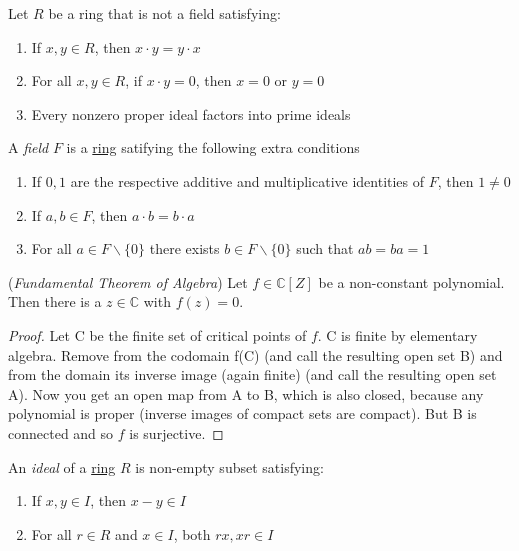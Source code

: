 \begin{definition} \label{dedekind} %
  Let $R$ be a ring that is not a field satisfying:
  \begin{enumerate}
    \item If $x,y \in R$, then $x \cdot y = y \cdot x$
    \item For all $x,y \in R $, if $x\cdot y = 0$, then $x = 0 $ or $y = 0$
    \item Every nonzero proper ideal factors into prime ideals 
  \end{enumerate}
\end{definition}

\begin{definition} \label{field} %
  A \emph{field} $F$ is a \hyperref[ring]{ring} satifying the following extra conditions
  \begin{enumerate}
    \item If $0,1$ are the respective additive and multiplicative identities of $F$, then $1 \neq 0$
    \item If $a,b \in F$, then $a\cdot b = b \cdot a$ 
    \item For all $a \in F \backslash \lbrace 0 \rbrace $ there exists $b \in F \backslash \lbrace 0 \rbrace $ such that $ab = ba = 1$
  \end{enumerate}
\end{definition}

\begin{theorem} \label{fun} (\textit{Fundamental Theorem of Algebra})
  Let $f \in \mathbb{C}[Z]$ be a non-constant polynomial.  Then there is a $z\in\mathbb{C}$ with $f(z)=0$.
\end{theorem}
\begin{proof}
  Let C be the finite set of critical points of $f$. C is finite by elementary algebra. Remove from the codomain f(C) (and call the resulting open set B) and from the domain its inverse image (again finite) (and call the resulting open set A). Now you get an open map from A to B, which is also closed, because any polynomial is proper (inverse images of compact sets are compact). But B is connected and so $f$ is surjective.
\end{proof}

\begin{definition} \label{ideal} %
  An \emph{ideal} of a \hyperref[ring]{ring} $R$ is non-empty subset satisfying: 
  \begin{enumerate}
    \item If $x,y \in I$, then $x - y \in I$ 
    \item For all $r \in R$ and $x \in I$, both $rx,xr \in I$
  \end{enumerate}
\end{definition}

